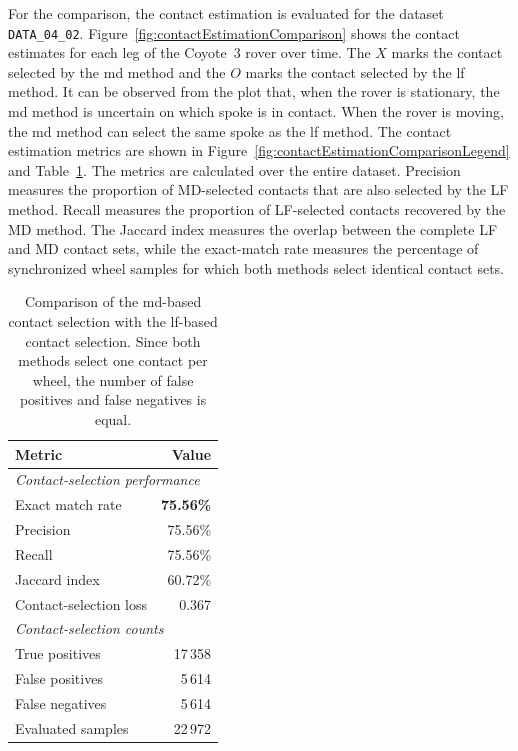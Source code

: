\documentclass[report.tex]{subfiles}
\begin{document}
    For the comparison, the contact estimation is evaluated for the dataset \texttt{DATA\_04\_02}. Figure~\ref{fig:contactEstimationComparison} shows the contact estimates for each leg of the Coyote~3 rover over time. The $X$ marks the contact selected by the \gls{md} method and the $O$ marks the contact selected by the \gls{lf} method. It can be observed from the plot that, when the rover is stationary, the \gls{md} method is uncertain on which spoke is in contact. When the rover is moving, the \gls{md} method can select the same spoke as the \gls{lf} method. The contact estimation metrics are shown in Figure~\ref{fig:contactEstimationComparisonLegend} and Table~\ref{tab:contact_selection_metrics}. The metrics are calculated over the entire dataset. Precision measures the proportion of MD-selected contacts that are also selected by the LF method. Recall measures the proportion of LF-selected contacts recovered by the MD method. The Jaccard index measures the overlap between the complete LF and MD contact sets, while the exact-match rate measures the percentage of synchronized wheel samples for which both methods select identical contact sets.

    \begin{table}[!htbp]
    \centering
    \caption[Contact Selection Metrics for \texttt{DATA\_04\_02}]{Comparison of the \gls{md}-based contact selection with the \gls{lf}-based contact selection. Since both methods select one contact per wheel, the number of false positives and false negatives is equal. }
    \label{tab:contact_selection_metrics}
    
        \begin{tabular}{lr}
            \toprule
            \textbf{Metric} & \textbf{Value} \\
            \midrule
            \multicolumn{2}{l}{\textit{Contact-selection performance}} \\
            Exact match rate          & \textbf{75.56\%} \\
            Precision                 & 75.56\% \\
            Recall                    & 75.56\% \\
            Jaccard index             & 60.72\% \\
            Contact-selection loss    & 0.367 \\
            \midrule
            \multicolumn{2}{l}{\textit{Contact-selection counts}} \\
            True positives            & 17\,358 \\
            False positives           & 5\,614 \\
            False negatives           & 5\,614 \\
            Evaluated samples         & 22\,972 \\
            \bottomrule
        \end{tabular}
    \end{table}
    
\end{document}
